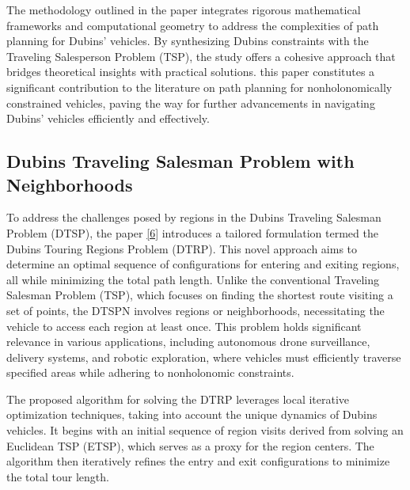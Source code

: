 \vspace{3mm}

The methodology outlined in the paper integrates rigorous mathematical frameworks and computational geometry to address the complexities of path planning for Dubins’ vehicles. By synthesizing Dubins constraints with the Traveling Salesperson Problem (TSP), the study offers a cohesive approach that bridges theoretical insights with practical solutions. this paper constitutes a significant contribution to the literature on path planning for nonholonomically constrained vehicles, paving the way for further advancements in navigating Dubins’ vehicles efficiently and effectively.











\subsection{Dubins Traveling Salesman Problem with Neighborhoods}

To address the challenges posed by regions in the Dubins Traveling Salesman Problem (DTSP), the paper \hyperlink{cite.DTSPN}{[6]} introduces a tailored formulation termed the Dubins Touring Regions Problem (DTRP). This novel approach aims to determine an optimal sequence of configurations for entering and exiting regions, all while minimizing the total path length. Unlike the conventional Traveling Salesman Problem (TSP), which focuses on finding the shortest route visiting a set of points, the DTSPN involves regions or neighborhoods, necessitating the vehicle to access each region at least once. This problem holds significant relevance in various applications, including autonomous drone surveillance, delivery systems, and robotic exploration, where vehicles must efficiently traverse specified areas while adhering to nonholonomic constraints.

\vspace{3mm}

The proposed algorithm for solving the DTRP leverages local iterative optimization techniques, taking into account the unique dynamics of Dubins vehicles. It begins with an initial sequence of region visits derived from solving an Euclidean TSP (ETSP), which serves as a proxy for the region centers. The algorithm then iteratively refines the entry and exit configurations to minimize the total tour length.

